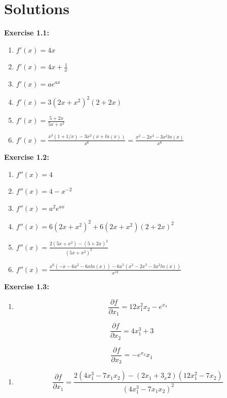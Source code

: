 \documentclass[
]{book}
\providecommand{\tightlist}{%
  \setlength{\itemsep}{0pt}\setlength{\parskip}{0pt}}
\theoremstyle{definition}
\theoremstyle{definition}
\theoremstyle{definition}
\theoremstyle{definition}
\theoremstyle{remark}
\begin{document}
\hypertarget{solutions-6}{%
\section*{Solutions}\label{solutions-6}}

\textbf{Exercise 1.1:}

\begin{enumerate}
\def\labelenumi{\alph{enumi}.}
\item
  \(f'(x)=4x\)
\item
  \(f'(x)=4x+\frac{1}{x}\)
\item
  \(f'(x)=ae^{ax}\)
\item
  \(f'(x)=3(2x+x^2)^2(2+2x)\)
\item
  \(f'(x)=\displaystyle \frac{5+2x}{5x+x^2}\)
\item
  \(f'(x)=\displaystyle \frac{x^3(1+1/x)-3x^2(x+ln(x))}{x^6}= \frac{x^2-2x^3-3x^2 ln(x)}{x^6}\)
\end{enumerate}

\textbf{Exercise 1.2:}

\begin{enumerate}
\def\labelenumi{\alph{enumi}.}
\item
  \(f''(x)=4\)
\item
  \(f''(x)=4-x^{-2}\)
\item
  \(f''(x)=a^2e^{ax}\)
\item
  \(f''(x)= 6(2x+x^2)^2+ 6(2x+x^2)(2+2x)^2\)
\item
  \(f''(x)=\displaystyle \frac{2(5x+x^2)-(5+2x)^2}{(5x+x^2)^2}\)
\item
  \(f''(x)=\displaystyle \frac{x^6(-x-6x^2-6xln(x))-6x^5(x^2-2x^3-3x^2 ln(x))}{x^{12}}\)
\end{enumerate}

\textbf{Exercise 1.3:}

\begin{enumerate}
\def\labelenumi{\alph{enumi}.}
\tightlist
\item
  \[\frac{\partial f}{\partial x_1}=12x_1^2x_2-e^{x_3} \]
\end{enumerate}

\[\frac{\partial f}{\partial x_2}=4x_1^3+3 \]

\[\frac{\partial f}{\partial x_3}=-e^{x_3}x_1 \]

\begin{enumerate}
\def\labelenumi{\alph{enumi}.}
\setcounter{enumi}{1}
\tightlist
\item
  \[\frac{\partial f}{\partial x_1}=\frac{2(4x_1^3-7x_1x_2)-(2x_1+3_x2)(12x_1^2-7x_2)}{(4x_1^3-7x_1x_2)^2}\]
\end{enumerate}
\end{document}
